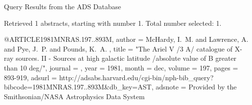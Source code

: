 Query Results from the ADS Database


Retrieved 1 abstracts, starting with number 1.  Total number selected: 1.

@ARTICLE{1981MNRAS.197..893M,
   author = {{McHardy}, I.~M. and {Lawrence}, A. and {Pye}, J.~P. and {Pounds}, K.~A.
	},
    title = "{The Ariel V /3 A/ catalogue of X-ray sources. II - Sources at high galactic latitude /absolute value of B greater than 10 deg/}",
  journal = {\mnras},
     year = 1981,
    month = dec,
   volume = 197,
    pages = {893-919},
   adsurl = {http://adsabs.harvard.edu/cgi-bin/nph-bib_query?bibcode=1981MNRAS.197..893M&db_key=AST},
  adsnote = {Provided by the Smithsonian/NASA Astrophysics Data System}
}


